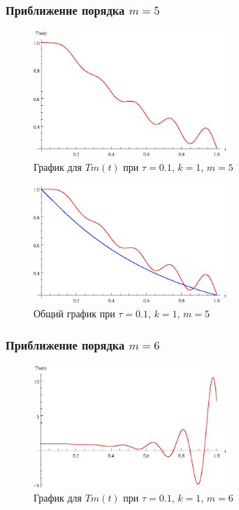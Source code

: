 \newpage

\subsubsection{Приближение порядка $m=5$}

\begin{figure}[h]
\begin{center}
\includegraphics[width=0.65\textwidth]{./3_results/1_10.eps}
\end{center}
\caption{График для $Tm(t)$ при $\tau=0.1$, $k=1$, $m=5$}
\end{figure}

\begin{figure}[h]
\begin{center}
\includegraphics[width=0.65\textwidth]{./3_results/1_11.eps}
\end{center}
\caption{Общий график при $\tau=0.1$, $k=1$, $m=5$}
\end{figure}

\newpage

\subsubsection{Приближение порядка $m=6$}

\begin{figure}[h]
\begin{center}
\includegraphics[width=0.65\textwidth]{./3_results/1_12.eps}
\end{center}
\caption{График для $Tm(t)$ при $\tau=0.1$, $k=1$, $m=6$}
\end{figure}

